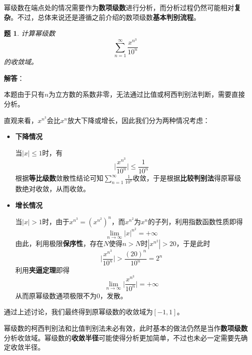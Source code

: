 \documentclass[a4paper,UTF8,fontset=windows,AutoFakeBold]{ctexart}
\newcommand*{\suminf}[1][n=1]{\sum_{#1}^\infty}
\newcommand*{\note}{\noindent *}
\theoremstyle{ex}
\newtheorem{exercise}{题}
\newcommand{\sol}[1]{{\vspace{5pt}\kaishu\noindent\textbf{解答}：\vspace{-3pt}
\begin{compactitem}
    \item[] #1
\end{compactitem}
}}
\begin{document}
\note 幂级数在端点处的情况需要作为\textbf{数项级数}进行分析，而分析过程仍然可能相对\textbf{复杂}。不过，总体来说还是遵循之前介绍的数项级数\textbf{基本判别流程}。

\begin{framed}
\begin{exercise}
    计算幂级数
    $$\suminf\frac{x^{n^3}}{10^n}$$
    的收敛域。
\end{exercise}
\sol{
    本题由于只有$n$为立方数的系数非零，无法通过比值或柯西判别法判断，需要直接分析。

    直观来看，$x^{n^3}$会比$x^n$放大下降或增长，因此我们分为两种情况考虑：
    \begin{itemize}
        \item \textbf{下降情况}
        
        当$|x|\le1$时，有
        $$\bigg|\frac{x^{n^3}}{10^n}\bigg|\le\frac{1}{10^n}$$
        根据\textbf{等比级数}敛散性结论可知$\suminf\frac{1}{10^n}$收敛，于是根据\textbf{比较判别法}得原幂级数绝对收敛，从而收敛。

        \item \textbf{增长情况}
        
        当$|x|>1$时，由于$x^{n^3}=(x^{n^2})^n$，而$x^{n^2}$为$x^n$的子列，利用指数函数性质即得
        $$\lim_{n\to\infty}|x|^{n^2}=+\infty$$
        由此，利用极限\textbf{保序性}，存在$N$使得$n>N$时$|x^{n^2}|>20$，于是此时
        $$\bigg|\frac{x^{n^3}}{10^n}\bigg|>\frac{(20)^n}{10^n}=2^n$$
        利用\textbf{夹逼定理}即得
        $$\lim_{n\to\infty}\bigg|\frac{x^{n^3}}{10^n}\bigg|=+\infty$$
        从而原幂级数通项极限不为0，发散。
    \end{itemize}

    通过上述讨论，我们最终得到原幂级数的收敛域为$[-1,1]$。
}
\end{framed}

\note 幂级数的柯西判别法和比值判别法未必有效，此时基本的做法仍然是当作\textbf{数项级数}分析收敛域。幂级数的\textbf{收敛半径}可能使得分析更加简单，不过也未必一定需要先确定收敛半径。
\end{document}
